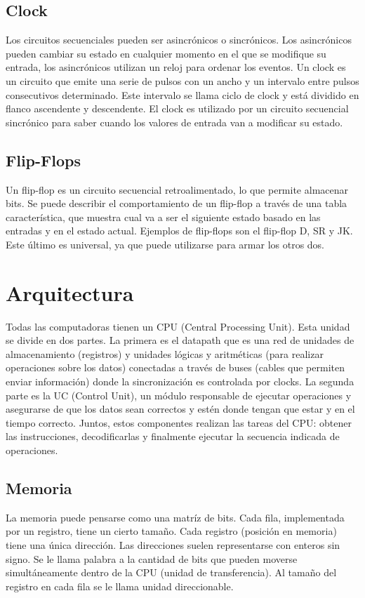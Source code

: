 \documentclass[a4paper,12pt]{article}
\begin{document}
\subsection{Clock}
Los circuitos secuenciales pueden ser asincrónicos o sincrónicos. Los asincrónicos pueden cambiar su estado en cualquier
momento en el que se modifique su entrada, los asincrónicos utilizan un reloj para ordenar los eventos.
Un clock es un circuito que emite una serie de pulsos con un ancho y un intervalo entre pulsos consecutivos determinado.
Este intervalo se llama ciclo de clock y está dividido en flanco ascendente y descendente. El clock es utilizado por un
circuito secuencial sincrónico para saber cuando los valores de entrada van a modificar su estado.

\subsection{Flip-Flops}
Un flip-flop es un circuito secuencial retroalimentado, lo que permite almacenar bits. Se puede describir el
comportamiento de un flip-flop a través de una tabla característica, que muestra cual va a ser el siguiente estado
basado en las entradas y en el estado actual. Ejemplos de flip-flops son el flip-flop D, SR y JK. Este último es
universal, ya que puede utilizarse para armar los otros dos.





\section{Arquitectura}
Todas las computadoras tienen un CPU (Central Processing Unit). Esta unidad se divide en dos partes. La primera es el
datapath que es una red de unidades de almacenamiento (registros) y unidades lógicas y aritméticas (para realizar
operaciones sobre los datos) conectadas a través de buses (cables que permiten enviar información) donde la
sincronización es controlada por clocks. La segunda parte es la UC (Control Unit), un módulo responsable de ejecutar
operaciones y asegurarse de que los datos sean correctos y estén donde tengan que estar y en el tiempo correcto. Juntos,
estos componentes realizan las tareas del CPU: obtener las instrucciones, decodificarlas y finalmente ejecutar la
secuencia indicada de operaciones.

\subsection{Memoria}
La memoria puede pensarse como una matríz de bits. Cada fila, implementada por un registro, tiene un cierto tamaño. Cada registro (posición en
memoria) tiene una única dirección. Las direcciones suelen representarse con enteros sin signo. Se le llama palabra a la cantidad de bits que
pueden moverse simultáneamente dentro de la CPU (unidad de transferencia). Al tamaño del registro en cada fila se le llama unidad direccionable.
\end{document}
